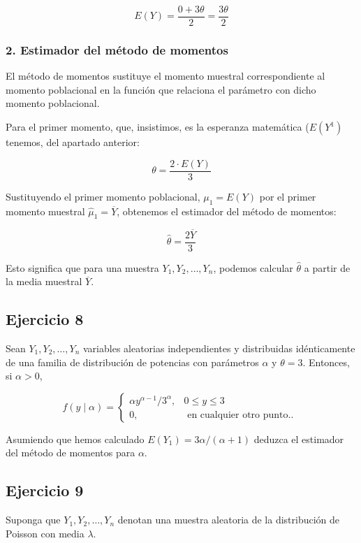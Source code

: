 \documentclass[
]{article}
\begin{document}
\[
E(Y) = \frac{0 + 3\theta}{2} = \frac{3\theta}{2}
\]

\subsubsection{2. Estimador del método de momentos}\label{estimador-del-muxe9todo-de-momentos}

El método de momentos sustituye el momento muestral correspondiente al momento poblacional en la función que relaciona el parámetro con dicho momento poblacional.

Para el primer momento, que, insistimos, es la esperanza matemática (\(E(Y^1)\) tenemos, del apartado anterior:

\[
\theta = \frac{2\cdot E(Y)}{3}
\]

Sustituyendo el primer momento poblacional, \(\mu_1= E(Y)\) por el primer momento muestral \(\hat \mu_1=\overline{Y}\), obtenemos el estimador del método de momentos:

\[
\hat{\theta} = \frac{2\overline{Y}}{3}
\]

Esto significa que para una muestra \(Y_1, Y_2, \ldots, Y_n\), podemos calcular \(\hat{\theta}\) a partir de la media muestral \(\overline{Y}\).

\subsection{Ejercicio 8}\label{ejercicio-8-2}

Sean \(Y_{1}, Y_{2}, \ldots, Y_{n}\) variables aleatorias independientes y distribuidas idénticamente de una familia de distribución de potencias con parámetros \(\alpha\) y \(\theta=3\). Entonces, si \(\alpha>0\),

\[
f(y \mid \alpha)= \begin{cases}\alpha y^{\alpha-1} / 3^{\alpha}, & 0 \leq y \leq 3 \\ 0, & \text { en cualquier otro punto.. }\end{cases}
\]

Asumiendo que hemos calculado \(E\left(Y_{1}\right)=3 \alpha /(\alpha+1)\) deduzca el estimador del método de momentos para \(\alpha\).

\subsection{Ejercicio 9}\label{ejercicio-9-1}

Suponga que \(Y_{1}, Y_{2}, \ldots, Y_{n}\) denotan una muestra aleatoria de la distribución de Poisson con media \(\lambda\).
\end{document}
